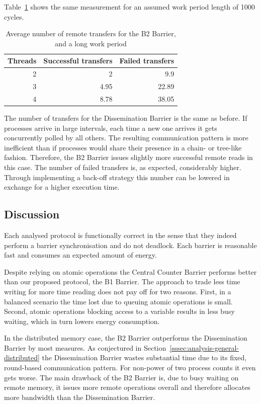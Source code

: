 \documentclass[a4paper, 10pt]{article}
\begin{document}
Table~\ref{tab:d2-transfers-1000} shows the same measurement for an assumed work period length of 1000 cycles.
\begin{table}[htbp]
	\centering
	\caption{Average number of remote transfers for the B2 Barrier, and a long work period}
	\vspace{0.2cm}
	\begin{tabular}{r | r r}
		Threads & Successful transfers & Failed transfers \\
		\hline
		2       & 2                     & 9.9             \\
		3       & 4.95                  & 22.89           \\
		4       & 8.78                  & 38.05           \\
	\end{tabular}
	\label{tab:d2-transfers-1000}
\end{table}
The number of transfers for the Dissemination Barrier is the same as before.
If processes arrive in large intervals, each time a new one arrives it gets concurrently polled by all others. The resulting communication pattern is more inefficient than if processes would share their presence in a chain- or tree-like fashion. Therefore, the B2 Barrier issues slightly more successful remote reads in this case.
The number of failed transfers is, as expected, considerably higher.
Through implementing a back-off strategy this number can be lowered in exchange for a higher execution time.

\subsection{Discussion}
\label{ssec:analysis-discussion}
Each analysed protocol is functionally correct in the sense that they indeed perform a barrier synchronisation and do not deadlock.
Each barrier is reasonable fast and consumes an expected amount of energy.

Despite relying on atomic operations the Central Counter Barrier performs better than our proposed protocol, the B1 Barrier.
The approach to trade less time writing for more time reading does not pay off for two reasons.
First, in a balanced scenario the time lost due to queuing atomic operations is small. Second, atomic operations blocking access to a variable results in less busy waiting, which in turn lowers energy consumption.

In the distributed memory case, the B2 Barrier outperforms the Dissemination Barrier by most measures.
As conjectured in Section~\ref{sssec:analysis-general-distributed} the Dissemination Barrier wastes substantial time due to its fixed, round-based communication pattern. For non-power of two process counts it even gets worse.
The main drawback of the B2 Barrier is, due to busy waiting on remote memory, it issues more remote operations overall and therefore allocates more bandwidth than the Dissemination Barrier.
\end{document}
